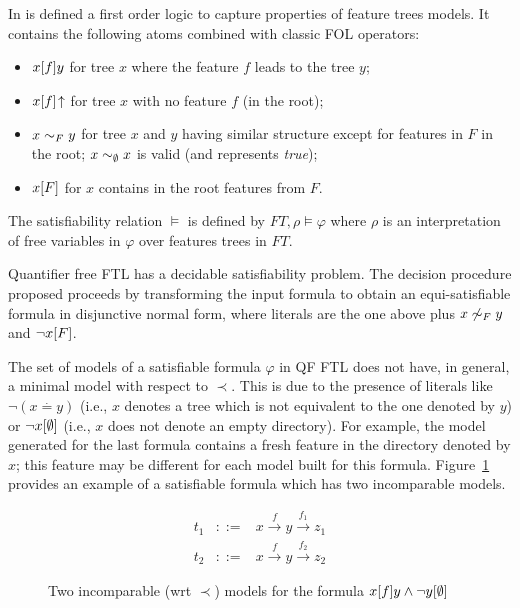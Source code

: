 In \cite{jeannerod:hal-01807474} is defined a first order logic
to capture properties of feature trees models.
It contains the following atoms combined with classic FOL operators:
\begin{itemize}
\item $x[f]y$ for tree $x$ where the feature $f$ leads to the tree $y$;
\item $x[f]\!\uparrow$ for tree $x$ with no feature $f$ (in the root);
\item $x \mathrel{\sim_{F}} y$ for tree $x$ and $y$ having similar structure except
for features in $F$ in the root; $x \mathrel{\sim_{\emptyset}} x$ is valid (and represents \textit{true});
\item $x[F]$ for $x$ contains in the root features from $F$.
\end{itemize}

The satisfiability relation $\models$ is defined by
$FT,\rho \models \varphi$
where
$\rho$ is an interpretation of free variables in $\varphi$ over features trees in $FT$.

Quantifier free FTL has a decidable satisfiability problem.
The decision procedure proposed \cite{jeannerod:hal-01807474}
proceeds by transforming the input formula to obtain an equi-satisfiable formula
in disjunctive normal form, where literals are
the one above plus $x \not\sim_{F} y$ and $\lnot x[F]$.


The set of models of a satisfiable formula $\varphi$ in QF FTL
does not have, in general, a minimal model with respect to $\prec$.
This is due to the presence of literals like
$\lnot (x\stackrel{.}{=}y)$
(i.e., $x$ denotes a tree which is not equivalent to the one denoted by $y$)
or $\lnot x[\emptyset]$ (i.e., $x$ does not denote an empty directory).
For example, the model generated for the last formula contains
        a fresh feature in the directory denoted by $x$;
        this feature may be different for each model built for this formula.
Figure~\ref{fig:min-model} provides an example of a satisfiable formula
which has two incomparable models.


\begin{figure}[htbp]
\begin{center}
\begin{eqnarray}
t_1 & ::= & x \stackrel{f}{\rightarrow} y \stackrel{f_1}{\rightarrow} z_1 \\
t_2 & ::= & x \stackrel{f}{\rightarrow} y \stackrel{f_2}{\rightarrow} z_2
\end{eqnarray}
\caption{Two incomparable (wrt $\prec$) models for
the formula $x[f]y \land \lnot y[\emptyset]$}
\label{fig:min-model}
\end{center}
\end{figure}


